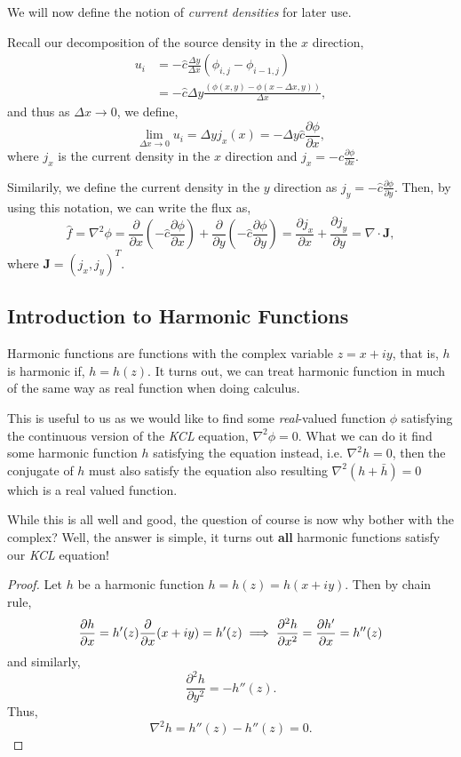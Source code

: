 \documentclass[]{article}
\begin{document}
We will now define the notion of \emph{current densities} for later use.

Recall our decomposition of the source density in the \(x\) direction,
\[
\begin{split}
u_i & = -\hat{c}\frac{\Delta y}{\Delta x}(\phi_{i, j}- \phi_{i-1,j})\\
 & = -\hat{c}\Delta y\frac{(\phi(x, y)- \phi(x- \Delta x, y))}{\Delta x},
\end{split}
\] and thus as \(\Delta x \to 0\), we define, \[
\lim_{\Delta x \to 0} u_i = \Delta y j_x(x) = -\Delta y\hat{c} \frac{\partial \phi}{\partial x},
\] where \(j_x\) is the current density in the \(x\) direction and
\(j_x = -\hat{c} \frac{\partial \phi}{\partial x}\).

Similarily, we define the current density in the \(y\) direction as
\(j_y = -\hat{c} \frac{\partial \phi}{\partial y}\). Then, by using this
notation, we can write the flux as, \[
\hat{f} = \nabla^2 \phi = \frac{\partial}{\partial x}\left(-\hat{c} \frac{\partial \phi}{\partial x} \right) + \frac{\partial}{\partial y}\left(- \hat{c} \frac{\partial \phi}{\partial y} \right) = \frac{\partial j_x}{\partial x} + \frac{\partial j_y}{\partial y} = \nabla \cdot \mathbf{J},
\] where \(\mathbf{J} = (j_x, j_y)^T\).

\subsection{Introduction to Harmonic
Functions}\label{introduction-to-harmonic-functions}

Harmonic functions are functions with the complex variable
\(z = x + iy\), that is, \(h\) is harmonic if, \(h = h(z)\). It turns
out, we can treat harmonic function in much of the same way as real
function when doing calculus.

This is useful to us as we would like to find some \emph{real}-valued
function \(\phi\) satisfying the continuous version of the \emph{KCL}
equation, \(\nabla^2 \phi = 0\). What we can do it find some harmonic
function \(h\) satisfying the equation instead, i.e. \(\nabla^2 h= 0\),
then the conjugate of \(h\) must also satisfy the equation also
resulting \(\nabla^2(h + \bar{h})= 0\) which is a real valued function.

While this is all well and good, the question of course is now why
bother with the complex? Well, the answer is simple, it turns out
\textbf{all} harmonic functions satisfy our \emph{KCL} equation!

\begin{proof}
Let $h$ be a harmonic function $h = h(z) = h(x + iy)$. Then by chain rule,
$$
\frac{\partial h}{\partial x} = h'(z)\frac{\partial}{\partial x}(x + iy) = h'(z)\\
\implies \frac{\partial^2 h}{\partial x^2} = \frac{\partial h'}{\partial x} = h''(z)
$$
and similarly,
$$
\frac{\partial^2 h}{\partial y^2} = -h''(z).
$$
Thus,
$$\nabla^2 h = h''(z) - h''(z) =0.$$
\end{proof}
\end{document}
